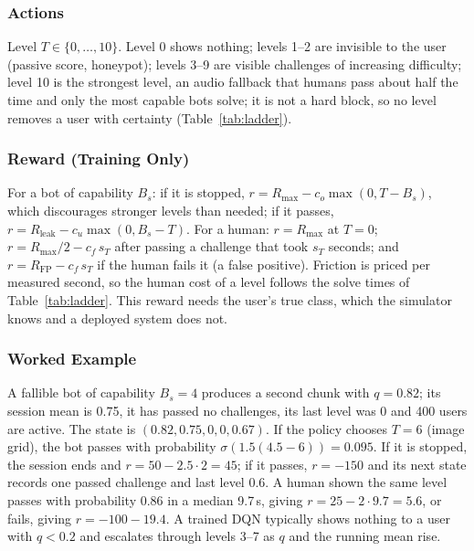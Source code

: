 \documentclass{ieeetj}
\begin{document}
\vspace{-15pt}
\subsubsection{Actions}
Level $T\in\{0,\dots,10\}$. Level 0 shows nothing; levels 1--2 are invisible to the user (passive score, honeypot); levels 3--9 are visible challenges of increasing difficulty; level 10 is the strongest level, an audio fallback that humans pass about half the time and only the most capable bots solve; it is not a hard block, so no level removes a user with certainty (Table~\ref{tab:ladder}).

\vspace{-15pt}
\subsubsection{Reward (Training Only)}
For a bot of capability $B_s$: if it is stopped, $r = R_{\max} - c_o\max(0, T-B_s)$, which discourages stronger levels than needed; if it passes, $r = R_{\text{leak}} - c_u\max(0, B_s-T)$. For a human: $r=R_{\max}$ at $T=0$; $r = R_{\max}/2 - c_f\,s_T$ after passing a challenge that took $s_T$ seconds; and $r = R_{\text{FP}} - c_f\,s_T$ if the human fails it (a false positive). Friction is priced per measured second, so the human cost of a level follows the solve times of Table~\ref{tab:ladder}. This reward needs the user's true class, which the simulator knows and a deployed system does not.

\vspace{-15pt}
\subsubsection{Worked Example}
A fallible bot of capability $B_s=4$ produces a second chunk with $q=0.82$; its session mean is 0.75, it has passed no challenges, its last level was 0 and 400 users are active. The state is $(0.82, 0.75, 0, 0, 0.67)$. If the policy chooses $T=6$ (image grid), the bot passes with probability $\sigma(1.5(4.5-6))=0.095$. If it is stopped, the session ends and $r=50-2.5\cdot2=45$; if it passes, $r=-150$ and its next state records one passed challenge and last level 0.6. A human shown the same level passes with probability 0.86 in a median 9.7\,s, giving $r=25-2\cdot9.7=5.6$, or fails, giving $r=-100-19.4$. A trained DQN typically shows nothing to a user with $q<0.2$ and escalates through levels 3--7 as $q$ and the running mean rise.

\vspace{-15pt}
\end{document}
